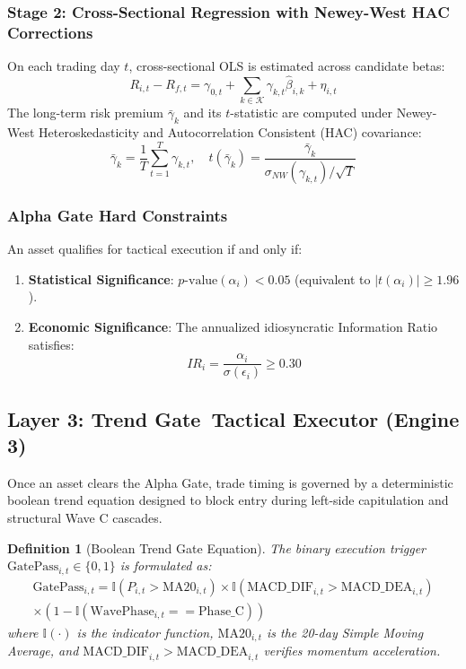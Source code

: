 \documentclass[journal,10pt,twocolumn]{IEEEtran}
\newtheorem{definition}{Definition}
\begin{document}
\subsubsection{Stage 2: Cross-Sectional Regression with Newey-West HAC Corrections}
On each trading day $t$, cross-sectional OLS is estimated across candidate betas:
\begin{equation}
R_{i,t} - R_{f,t} = \gamma_{0,t} + \sum_{k \in \mathcal{K}} \gamma_{k,t} \hat{\beta}_{i,k} + \eta_{i,t}
\label{eq:stage2}
\end{equation}
The long-term risk premium $\bar{\gamma}_k$ and its $t$-statistic are computed under Newey-West Heteroskedasticity and Autocorrelation Consistent (HAC) covariance:
\begin{equation}
\bar{\gamma}_k = \frac{1}{T}\sum_{t=1}^T \gamma_{k,t}, \quad t(\bar{\gamma}_k) = \frac{\bar{\gamma}_k}{\sigma_{NW}(\gamma_{k,t}) / \sqrt{T}}
\label{eq:newey_west}
\end{equation}

\subsubsection{Alpha Gate Hard Constraints}
An asset qualifies for tactical execution if and only if:
\begin{enumerate}
    \item \textbf{Statistical Significance}: $p\text{-value}(\alpha_i) < 0.05$ (equivalent to $|t(\alpha_i)| \ge 1.96$).
    \item \textbf{Economic Significance}: The annualized idiosyncratic Information Ratio satisfies:
    \begin{equation}
    IR_i = \frac{\alpha_i}{\sigma(\epsilon_i)} \ge 0.30
    \label{eq:ir}
    \end{equation}
\end{enumerate}

\subsection{Layer 3: Trend Gate\texttrademark\ Tactical Executor (Engine 3)}
Once an asset clears the Alpha Gate, trade timing is governed by a deterministic boolean trend equation designed to block entry during left-side capitulation and structural Wave C cascades.

\begin{definition}[Boolean Trend Gate Equation]
The binary execution trigger $\text{GatePass}_{i,t} \in \{0, 1\}$ is formulated as:
\begin{multline}
\text{GatePass}_{i,t} = \mathbb{I}(P_{i,t} > \text{MA20}_{i,t}) \times \mathbb{I}(\text{MACD\_DIF}_{i,t} > \text{MACD\_DEA}_{i,t}) \\
\times (1 - \mathbb{I}(\text{WavePhase}_{i,t} == \text{Phase\_C}))
\label{eq:trend_gate}
\end{multline}
where $\mathbb{I}(\cdot)$ is the indicator function, $\text{MA20}_{i,t}$ is the 20-day Simple Moving Average, and $\text{MACD\_DIF}_{i,t} > \text{MACD\_DEA}_{i,t}$ verifies momentum acceleration.
\end{definition}
\end{document}
